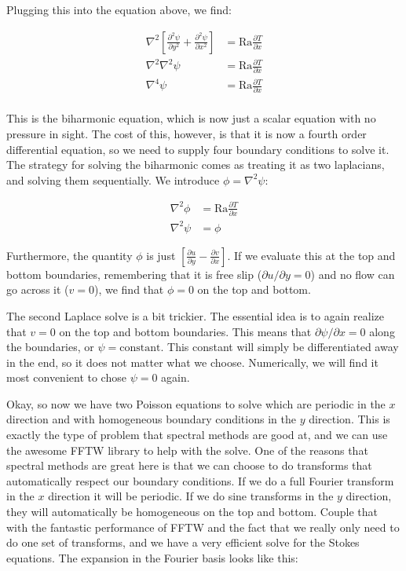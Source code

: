 \documentclass[a4paper,10pt]{article}
\begin{document}
Plugging this into the equation above, we find:

\begin{equation}
\begin{aligned}
\nabla^2 \left[ \frac{\partial^2 \psi}{\partial y^2} + \frac{\partial^2 \psi}{\partial x^2} \right] &= \mathrm{Ra} \frac{\partial{T}}{\partial x} \\
\nabla^2 \nabla^2 \psi &= \mathrm{Ra} \frac{\partial{T}}{\partial x} \\
\nabla^4 \psi &= \mathrm{Ra} \frac{\partial{T}}{\partial x} \\
\end{aligned}
\end{equation}

This is the biharmonic equation, which is now just a scalar equation with no pressure in sight.  
The cost of this, however, is that it is now a fourth order differential equation, so we need to supply four boundary conditions to solve it.
The strategy for solving the biharmonic comes as treating it as two laplacians, and solving them sequentially.  We introduce $\phi = \nabla^2 \psi$:

\begin{equation}
\begin{aligned}
\nabla^2 \phi &= \mathrm{Ra} \frac{\partial T}{\partial x} \\
\nabla^2 \psi &= \phi
\end{aligned}
\end{equation}

Furthermore, the quantity $\phi$ is just $\left[ \frac{\partial u}{\partial y} - \frac{\partial v}{\partial x} \right]$. 
If we evaluate this at the top and bottom boundaries, remembering that it is free slip ($\partial u /\partial y = 0$)  and no flow can go across it ($v=0$), we find that $\phi=0$ on the top and bottom.

The second Laplace solve is a bit trickier.  The essential idea is to again realize that $v=0$ on the top and bottom boundaries.  
This means that $\partial \psi /\partial x = 0$ along the boundaries, or $\psi = \mathrm{constant}$.
This constant will simply be differentiated away in the end, so it does not matter what we choose.
Numerically, we will find it most convenient to chose $\psi=0$ again. 

Okay, so now we have two Poisson equations to solve which are periodic in the $x$ direction and with homogeneous boundary conditions in the $y$ direction.
This is exactly the type of problem that spectral methods are good at, and we can use the awesome FFTW library to help with the solve. 
One of the reasons that spectral methods are great here is that we can choose to do transforms that automatically respect our boundary conditions.
If we do a full Fourier transform in the $x$ direction it will be periodic.
If we do sine transforms in the $y$ direction, they will automatically be homogeneous on the top and bottom.
Couple that with the fantastic performance of FFTW and the fact that we really only need to do one set of transforms, and we have a very efficient solve for the Stokes equations.
The expansion in the Fourier basis looks like this:
\end{document}

